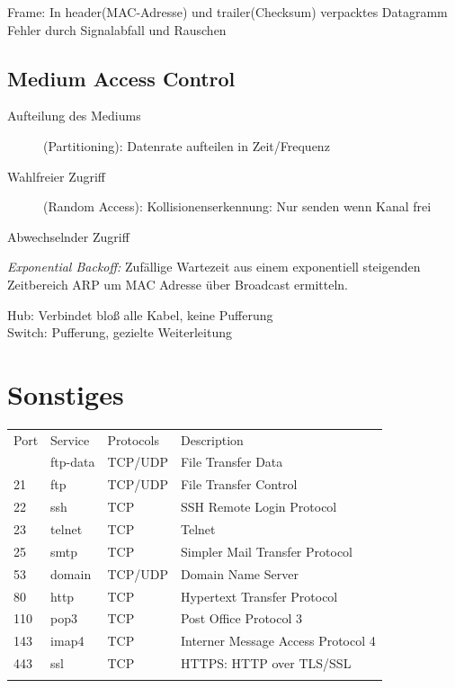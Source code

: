\documentclass[fs, footer]{latex4ei}
\begin{document}
\begin{multicols*}{4}
Frame: In header(MAC-Adresse) und trailer(Checksum) verpacktes Datagramm\\
Fehler durch Signalabfall und Rauschen\\

	\subsection{Medium Access Control}
	\begin{description}
		\item [Aufteilung des Mediums] (Partitioning): Datenrate aufteilen in Zeit/Frequenz
		\item [Wahlfreier Zugriff] (Random Access): Kollisionenserkennung: Nur senden wenn Kanal frei
		\item [Abwechselnder Zugriff]
	\end{description}
	\emph{Exponential Backoff:} Zufällige Wartezeit aus einem exponentiell steigenden Zeitbereich
	ARP um MAC Adresse über Broadcast ermitteln.


	Hub: Verbindet bloß alle Kabel, keine Pufferung\\
	Switch: Pufferung, gezielte Weiterleitung





\section{Sonstiges}

\begin{tabular*}{\columnwidth}{@{\extracolsep\fill}llll@{}} \trule
Port & Service & Protocols & Description \\ \mrule
20 & ftp-data & TCP/UDP & File Transfer Data\\
21 & ftp & TCP/UDP & File Transfer Control\\
22 & ssh & TCP & SSH Remote Login Protocol\\
23 & telnet & TCP & Telnet \\
25 & smtp & TCP & Simpler Mail Transfer Protocol\\
53 & domain & TCP/UDP & Domain Name Server\\
80 & http & TCP & Hypertext Transfer Protocol\\
110 & pop3 & TCP & Post Office Protocol 3\\
143 & imap4 & TCP & Interner Message Access Protocol 4\\
443 & ssl & TCP & HTTPS: HTTP over TLS/SSL\\ \brule
\end{tabular*}



\end{multicols*}

\end{document}
